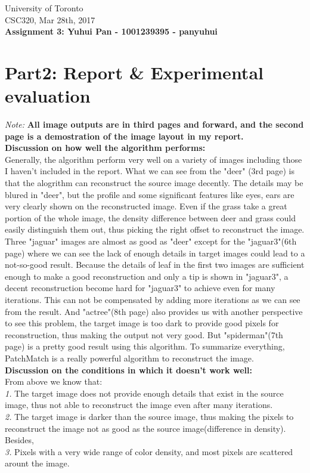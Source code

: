 \documentclass{article}
\begin{document}
\noindent
University of Toronto\\
{\sc CSC}320, Mar 28th, 2017\\[10pt]
{\LARGE\bf Assignment 3: Yuhui Pan - 1001239395 - panyuhui} \\[10pt]

\section*{Part2: Report \& Experimental evaluation }
\noindent
\textit{Note:}
\textbf{All image outputs are in third pages and forward, and the second page is a demostration of the image layout in my report.}\\[8pt]

\noindent
\textbf{Discussion on how well the algorithm performs:}\\[8pt]
Generally, the algorithm perform very well on a variety of images including those I haven't included in the report. What we can see from the "deer" (3rd page) is that the alogrithm can reconstruct the source image decently. The details may be blured in "deer", but the profile and some significant features like eyes, ears are very clearly shown on the reconstructed image. Even if the grass take a great portion of the whole image, the density difference between deer and grass could easily distinguish them out, thus picking the right offset to reconstruct the image. Three "jaguar" images are almost as good as "deer" except for the "jaguar3"(6th page) where we can see the lack of enough details in target images could lead to a not-so-good result. Because the details of leaf in the first two images are sufficient enough to make a good reconstruction and only a tip is shown in "jaguar3", a decent reconstruction become hard for "jaguar3" to achieve even for many iterations. This can not be compensated by adding more iterations as we can see from the result. And "actree"(8th page) also provides us with another perspective to see this problem, the target image is too dark to provide good pixels for reconstruction, thus making the output not very good. But "spiderman"(7th page) is a pretty good result using this algorithm. To summarize everything, PatchMatch is a really powerful algorithm to reconstruct the image.\\

\noindent
\textbf{Discussion on the conditions in which it doesn't work well:}\\[8pt]
From above we know that:\\[5pt]
\textit{1.} The target image does not provide enough details that exist in the source image, thus not able to reconstruct the image even after many iterations.\\[3pt]
\textit{2.} The target image is darker than the source image, thus making the pixels to reconstruct the image not as good as the source image(difference in density).\\[3pt]
Besides,\\[5pt]
\textit{3.} Pixels with a very wide range of color density, and most pixels are scattered arount the image.
\end{document}

